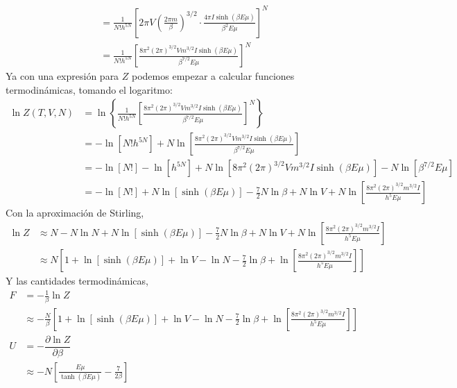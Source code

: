 \documentclass[]{article}
\numberwithin{equation}{section}
\newcommand{\0}{\textcolor{gray}{0}}
\newcommand{\pd}[2]{\dfrac{\partial #1}{\partial #2}}
\begin{document}
\begin{enumerate}
\begin{align}
		&= \frac{1}{N! h^{5N}} \left[2\pi V\left(\frac{2\pi m}{\beta}\right)^{3/2} \cdot \frac{4 \pi I \sinh\left(\beta E \mu\right)}{\beta^2 E \mu}\right]^{N}\nonumber\\
		&= \frac{1}{N! h^{5N}} \left[\frac{8 \pi^2  \left(2\pi \right)^{3/2} V m^{3/2} I \sinh\left(\beta E \mu\right)}{\beta^{7/2} E \mu} \right]^{N}
	\end{align}
	Ya con una expresión para $Z$ podemos empezar a calcular funciones termodinámicas, tomando el logaritmo:
	\begin{align*}
		\ln Z(T,V,N) &= \ln \left\{\frac{1}{N! h^{5N}} \left[\frac{8 \pi^2  \left(2\pi \right)^{3/2} V m^{3/2} I \sinh\left(\beta E \mu\right)}{\beta^{7/2} E \mu} \right]^{N}\right\} \\
		&= -\ln\left[N! h^{5N}\right] + N \ln \left[\frac{8 \pi^2  \left(2\pi \right)^{3/2} V m^{3/2} I \sinh\left(\beta E \mu\right)}{\beta^{7/2} E \mu} \right] \\
		&= -\ln\left[N!\right] - \ln\left[h^{5N}\right] + N \ln \left[8 \pi^2  \left(2\pi \right)^{3/2} V m^{3/2} I \sinh\left(\beta E \mu\right) \right] - N \ln \left[\beta^{7/2} E \mu\right] \\
		&= -\ln\left[N!\right]+ N\ln\left[\sinh\left(\beta E \mu\right)\right] - \frac{7}{2}N \ln \beta + N \ln V + N \ln \left[\frac{8 \pi^2  \left(2\pi \right)^{3/2} m^{3/2} I}{ h^5 E \mu} \right]
	\end{align*}
	Con la aproximación de Stirling,
	\begin{align}
		\ln Z &\approx N - N \ln N + N\ln\left[\sinh\left(\beta E \mu\right)\right] - \frac{7}{2}N \ln \beta + N \ln V + N \ln \left[\frac{8 \pi^2  \left(2\pi \right)^{3/2} m^{3/2} I}{ h^5 E \mu} \right] \nonumber\\
		&\approx N \left[1 + \ln\left[\sinh\left(\beta E \mu\right)\right] + \ln V - \ln N - \frac{7}{2} \ln \beta + \ln \left[\frac{8 \pi^2  \left(2\pi \right)^{3/2} m^{3/2} I}{ h^5 E \mu} \right]\right]
	\end{align}
	Y las cantidades termodinámicas,
	\begin{align}
		F &= -\frac{1}{\beta}\ln Z \nonumber\\
		&\approx -\frac{N}{\beta} \left[1 + \ln\left[\sinh\left(\beta E \mu\right)\right] + \ln V - \ln N - \frac{7}{2} \ln \beta + \ln \left[\frac{8 \pi^2  \left(2\pi \right)^{3/2} m^{3/2} I}{ h^5 E \mu} \right]\right]\\
		U &= - \pd{\ln Z}{\beta}\nonumber\\
		&\approx - N \left[ \frac{E \mu}{\tanh\left(\beta E \mu\right)} - \frac{7}{2\beta}\right]\\

\end{align}
\end{enumerate}
\end{document}
